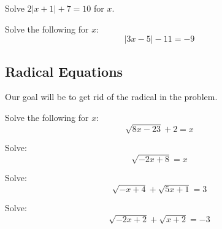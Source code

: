 \begin{exercise}
Solve $2\vert x+1\vert+7=10$ for $x$.
\end{exercise}
\begin{solution}[3in]

\end{solution}
\vspace{0.5em}

\begin{exercise}
Solve the following for $x$:
\[
\vert 3x-5\vert-11=-9
\]
\end{exercise}
\begin{solution}[3in]

\end{solution}
\vspace{0.5em}

\subsection{Radical Equations}

Our goal will be to get rid of the radical in the problem.

\begin{exercise}
Solve the following for $x$:
\[
\sqrt{8x-23}+2=x
\]
\end{exercise}
\begin{solution}[4in]

\end{solution}

\begin{exercise}
Solve:
\[
\sqrt{-2x+8}=x
\]
\end{exercise}
\begin{solution}[3in]

\end{solution}
\vspace{0.5em}

\begin{exercise}
Solve:
\[
\sqrt{-x+4}+\sqrt{5x+1}=3
\]
\end{exercise}
\begin{solution}[4in]

\end{solution}

\newpage

\begin{exercise}
Solve:
\[
\sqrt{-2x+2}+\sqrt{x+2}=-3
\]
\end{exercise}
\begin{solution}[2in]

\end{solution}
\vspace{0.5em}

